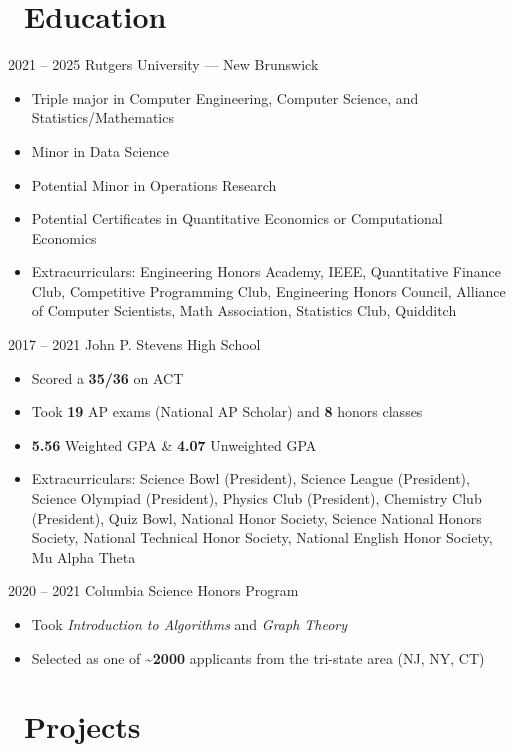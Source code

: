 \documentclass[12]{article}
\begin{document}
\vspace{-1.5\baselineskip}


\section{\faGraduationCap\ Education}
\entry
{2021 -- 2025}
{Rutgers University --- New Brunswick}
{
  \begin{itemize}
  \item Triple major in Computer Engineering, Computer Science, and Statistics/Mathematics
  \item Minor in Data Science
  \item Potential Minor in Operations Research
  \item Potential Certificates in Quantitative Economics or Computational Economics
  \item Extracurriculars: Engineering Honors Academy, IEEE, Quantitative Finance Club, Competitive Programming Club, Engineering Honors Council, Alliance of Computer Scientists, Math Association, Statistics Club, Quidditch
  \end{itemize}
}

\entry
{2017 -- 2021}
{John P. Stevens High School}
{
  \begin{itemize}
  \item Scored a \textbf{35/36} on ACT
  \item Took \textbf{19} AP exams (National AP Scholar) and \textbf{8} honors classes
  \item \textbf{5.56} Weighted GPA \& \textbf{4.07} Unweighted GPA
  \item Extracurriculars: Science Bowl (President), Science League (President), Science Olympiad (President), Physics Club (President), Chemistry Club (President), Quiz Bowl, National Honor Society, Science National Honors Society, National Technical Honor Society, National English Honor Society, Mu Alpha Theta
  \end{itemize}
}

\entry
{2020 -- 2021}
{Columbia Science Honors Program}
{
  \begin{itemize}
  \item Took \emph{Introduction to Algorithms} and \emph{Graph Theory}
  \item Selected as one of \textbf{\textasciitilde 2000} applicants from the tri-state area (NJ, NY, CT)
  \end{itemize}
}



\section{\faSitemap\ Projects}
\end{document}
